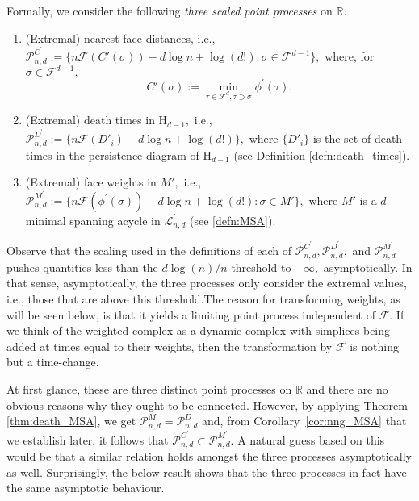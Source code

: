 \documentclass[12pt]{amsart}
\newcommand{\PoiD}{\mathscr{P}_{n, d}^{D}}
\newcommand{\PoiM}{\mathscr{P}_{n, d}^{M}}
\newcommand{\PoiFt}{\mathscr{P}_{n, d}^{C^\prime}}
\newcommand{\PoiMt}{\mathscr{P}_{n, d}^{M^\prime}}
\newcommand{\PoiDt}{\mathscr{P}_{n, d}^{D^\prime}}
\newcommand{\dy}[1]{\textcolor{magenta}{#1}}
\newcommand{\gt}[1]{\textcolor{blue}{#1}}
\renewcommand{\dy}[1]{#1}
\renewcommand{\gt}[1]{#1}
\numberwithin{equation}{section}
\numberwithin{theorem}{section}
\newcommand{\Real}{\mathbb R}
\newcommand{\Hg}{\mathrm{H}}
\newcommand{\1}{\mathbf{1}}
\def\F{\mathcal{F}}
\def\sF{\mathscr{F}}
\def\Lp{\mathcal{L}^\prime}
\def\phip{\phi^\prime}
\begin{document}
Formally, we consider the following {\em three scaled point processes} on $\Real.$
%
\begin{enumerate}
\item (Extremal) nearest face distances, i.e., $\PoiFt := \{n \sF(C'(\sigma)) - d\log n + \log(d!) : \sigma \in \F^{d - 1}\},$ where, for $\sigma \in \F^{d - 1},$
%
\begin{equation}
\label{eqn:Connection Time}
C'(\sigma) := \min\limits_{\tau \in \F^{d}, \tau \supset \sigma } \phip(\tau).
\end{equation}

\item (Extremal) death times in $\Hg_{d - 1},$ i.e., $\PoiDt := \{n \sF(D'_i) - d\log n + \log(d!)\},$ where $\{D'_i\}$ is the set of death times in the persistence diagram of $\Hg_{d - 1}$ (see Definition \ref{defn:death_times}).

\item (Extremal) face weights in $M',$ i.e., $\PoiMt := \{n \sF(\phip(\sigma)) - d\log n + \log(d!): \sigma \in M'\},$ where $M'$ is a $d-$minimal spanning acycle in $\Lp_{n, d}$ (see \eqref{defn:MSA}).
%
\end{enumerate}

\gt{Observe that  the scaling used in the definitions of each of $\PoiFt, \PoiDt,$ and $\PoiMt$ pushes quantities less than the $d \log(n)/n$ threshold to $-\infty,$ asymptotically. In that sense, asymptotically, the three processes only consider the extremal values, i.e., those that are above this threshold.}\dy{The reason for transforming weights, \gt{as will be seen below,} is that it yields a limiting point process independent of $\sF$. If we think of the weighted complex as a dynamic complex with simplices being added at times equal to their weights, then the transformation by $\sF$ is nothing but a time-change.} 

\gt{At first glance, these are three distinct point processes on $\Real$ and there are no obvious reasons why they ought to be connected. However, by applying Theorem \ref{thm:death_MSA}, we get $\PoiM = \PoiD$ and, from Corollary~\ref{cor:nng_MSA} that we establish later, it follows that $\PoiFt \subset \PoiMt.$ A natural guess based on this would be that a similar relation holds  amongst the three processes asymptotically as well. Surprisingly, the below result shows that the three processes in fact have the same asymptotic behaviour. }%
\end{document}
